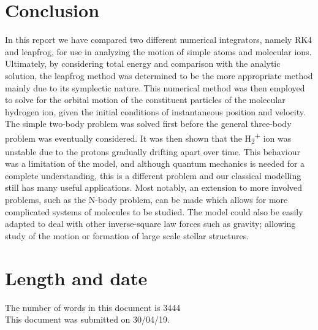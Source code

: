 \documentclass[12pt]{article} %
\numberwithin{equation}{subsection} %
\begin{document}
\section{Conclusion}
In this report we have compared two different numerical integrators, namely RK4 and leapfrog, for use in analyzing the motion of simple atoms and molecular ions. Ultimately, by considering total energy and comparison with the analytic solution, the leapfrog method was determined to be the more appropriate method mainly due to its symplectic nature. This numerical method was then employed to solve for the orbital motion of the constituent particles of the molecular hydrogen ion, given the initial conditions of instantaneous position and velocity. The simple two-body problem was solved first before the general three-body problem was eventually considered. It was then shown that the H\textsubscript{2}\textsuperscript{+} ion was unstable due to the protons gradually drifting apart over time. This behaviour was a limitation of the model, and although quantum mechanics is needed for a complete understanding, this is a different problem and our classical modelling still has many useful applications. Most notably, an extension to more involved problems, such as the N-body problem, can be made which allows for more complicated systems of molecules to be studied. The model could also be easily adapted to deal with other inverse-square law forces such as gravity; allowing study of the motion or formation of large scale stellar structures.

\section{Length and date}
The number of words in this document is 3444 \\
This document was submitted on 30/04/19.



\end{document}
